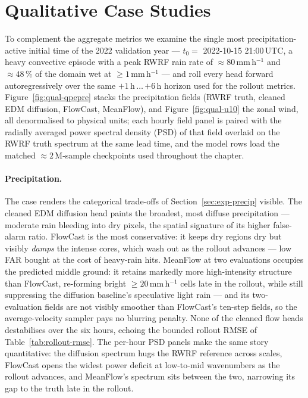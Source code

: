 \section{Qualitative Case Studies}
\label{sec:exp-qual}

To complement the aggregate metrics we examine the single most precipitation-active initial time of the 2022 validation year --- $t_0 = $ 2022-10-15 21:00\,UTC, a heavy convective episode with a peak RWRF rain rate of $\approx 80$\,mm\,h$^{-1}$ and $\approx 48\,\%$ of the domain wet at $\geq 1$\,mm\,h$^{-1}$ --- and roll every head forward autoregressively over the same $+1$\,h\,$\ldots$\,$+6$\,h horizon used for the rollout metrics. Figure~\ref{fig:qual-qpepre} stacks the precipitation fields (RWRF truth, cleaned EDM diffusion, FlowCast, MeanFlow), and Figure~\ref{fig:qual-u10} the zonal wind, all denormalised to physical units; each hourly field panel is paired with the radially averaged power spectral density (PSD) of that field overlaid on the RWRF truth spectrum at the same lead time, and the model rows load the matched $\approx 2\,\text{M}$-sample checkpoints used throughout the chapter.

\paragraph{Precipitation.} The case renders the categorical trade-offs of Section~\ref{sec:exp-precip} visible. The cleaned EDM diffusion head paints the broadest, most diffuse precipitation --- moderate rain bleeding into dry pixels, the spatial signature of its higher false-alarm ratio. FlowCast is the most conservative: it keeps dry regions dry but visibly \emph{damps} the intense cores, which wash out as the rollout advances --- low FAR bought at the cost of heavy-rain hits. MeanFlow at two evaluations occupies the predicted middle ground: it retains markedly more high-intensity structure than FlowCast, re-forming bright $\geq 20$\,mm\,h$^{-1}$ cells late in the rollout, while still suppressing the diffusion baseline's speculative light rain --- and its two-evaluation fields are not visibly smoother than FlowCast's ten-step fields, so the average-velocity sampler pays no blurring penalty. None of the cleaned flow heads destabilises over the six hours, echoing the bounded rollout RMSE of Table~\ref{tab:rollout-rmse}. The per-hour PSD panels make the same story quantitative: the diffusion spectrum hugs the RWRF reference across scales, FlowCast opens the widest power deficit at low-to-mid wavenumbers as the rollout advances, and MeanFlow's spectrum sits between the two, narrowing its gap to the truth late in the rollout.

